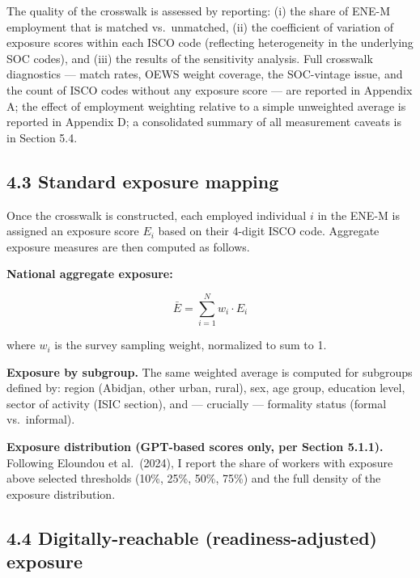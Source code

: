 \documentclass[
  11pt,
]{article}
\begin{document}
The quality of the crosswalk is assessed by reporting: (i) the share of
ENE-M employment that is matched vs.~unmatched, (ii) the coefficient of
variation of exposure scores within each ISCO code (reflecting
heterogeneity in the underlying SOC codes), and (iii) the results of the
sensitivity analysis. Full crosswalk diagnostics --- match rates, OEWS
weight coverage, the SOC-vintage issue, and the count of ISCO codes
without any exposure score --- are reported in Appendix A; the effect of
employment weighting relative to a simple unweighted average is reported
in Appendix D; a consolidated summary of all measurement caveats is in
Section 5.4.

\subsection{4.3 Standard exposure
mapping}\label{standard-exposure-mapping}

Once the crosswalk is constructed, each employed individual \(i\) in the
ENE-M is assigned an exposure score \(E_i\) based on their 4-digit ISCO
code. Aggregate exposure measures are then computed as follows.

\textbf{National aggregate exposure:}

\[\bar{E} = \sum_{i=1}^{N} w_i \cdot E_i\]

where \(w_i\) is the survey sampling weight, normalized to sum to 1.

\textbf{Exposure by subgroup.} The same weighted average is computed for
subgroups defined by: region (Abidjan, other urban, rural), sex, age
group, education level, sector of activity (ISIC section), and ---
crucially --- formality status (formal vs.~informal).

\textbf{Exposure distribution (GPT-based scores only, per Section
5.1.1).} Following Eloundou et al.~(2024), I report the share of workers
with exposure above selected thresholds (10\%, 25\%, 50\%, 75\%) and the
full density of the exposure distribution.

\subsection{4.4 Digitally-reachable (readiness-adjusted)
exposure}\label{digitally-reachable-readiness-adjusted-exposure}
\end{document}
